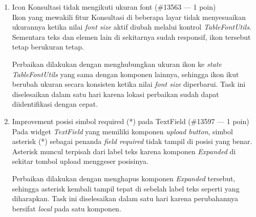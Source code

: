 \begin{enumerate}
          Improvement ini menambahkan dukungan parameter \textit{margin} dan
          \textit{padding} pada model SDUI dari widget \textit{Text}, \textit{TextField},
          dan \textit{Section}, sehingga Tim \textit{Back-End} bisa mengatur tata letak
          komponen langsung dari konfigurasi JSON tanpa perlu mengubah kode
          \textit{front-end}. Nilai default tetap dipertahankan agar layar yang tidak
          mengirim parameter ini tidak mengalami perubahan tampilan.

          Pengerjaan task ini memakan waktu empat hari (17--22 April 2026) karena cakupan
          widget yang terdampak cukup luas --- setiap tipe widget perlu ditangani secara
          terpisah sesuai dengan struktur model yang dimilikinya. Task ini merupakan
          salah satu task dengan bobot poin tertinggi (8 poin) selama periode magang.

    \item Icon Konsultasi tidak mengikuti ukuran font (\#13563 --- 1 poin) \\ Ikon yang
          mewakili fitur Konsultasi di beberapa layar tidak menyesuaikan ukurannya ketika
          nilai \textit{font size} aktif diubah melalui kontrol \textit{TableFontUtils}.
          Sementara teks dan elemen lain di sekitarnya sudah responsif, ikon tersebut
          tetap berukuran tetap.

          Perbaikan dilakukan dengan menghubungkan ukuran ikon ke \textit{state}
          \textit{TableFontUtils} yang sama dengan komponen lainnya, sehingga ikon ikut
          berubah ukuran secara konsisten ketika nilai \textit{font size} diperbarui.
          Task ini diselesaikan dalam satu hari karena lokasi perbaikan sudah dapat
          diidentifikasi dengan cepat.

    \item Improvement posisi simbol required (*) pada TextField (\#13597 --- 1 poin) \\
          Pada widget \textit{TextField} yang memiliki komponen \textit{upload button},
          simbol asterisk (*) sebagai penanda \textit{field required} tidak tampil di
          posisi yang benar. Asterisk muncul terpisah dari label teks karena komponen
          \textit{Expanded} di sekitar tombol upload menggeser posisinya.

          Perbaikan dilakukan dengan menghapus komponen \textit{Expanded} tersebut,
          sehingga asterisk kembali tampil tepat di sebelah label teks seperti yang
          diharapkan. Task ini diselesaikan dalam satu hari karena perubahannya bersifat
          \textit{local} pada satu komponen.


\end{enumerate}
